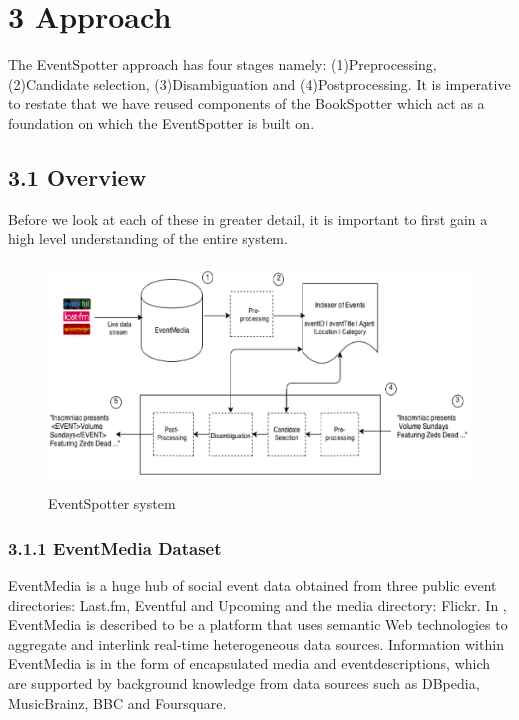 \documentclass[a4paper,11pt]{report}
\begin{document}


\chapter*{3 Approach}
The EventSpotter approach has four stages namely: (1)Preprocessing, (2)Candidate selection, (3)Disambiguation and (4)Postprocessing. It is imperative to restate that we have reused components of the BookSpotter which act as a foundation on which the EventSpotter is built on.

\section*{3.1 Overview}
Before we look at each of these in greater detail, it is important to first gain a high level understanding of the entire system.
\begin{figure}
\includegraphics [width=13cm,height=6cm]{architecture}
\caption{EventSpotter system}
\end{figure}


\subsection*{3.1.1 EventMedia Dataset}
EventMedia is a huge hub of social event data obtained from three public event directories: Last.fm, Eventful and Upcoming and the media directory: Flickr. In \cite{EURECOM+3865}, EventMedia is described to be a platform that uses semantic Web technologies to aggregate and interlink real-time heterogeneous data sources. Information within EventMedia is in the form of encapsulated media and eventdescriptions, which are supported by background knowledge from data sources such as DBpedia, MusicBrainz, BBC and Foursquare. 
\end{document}
